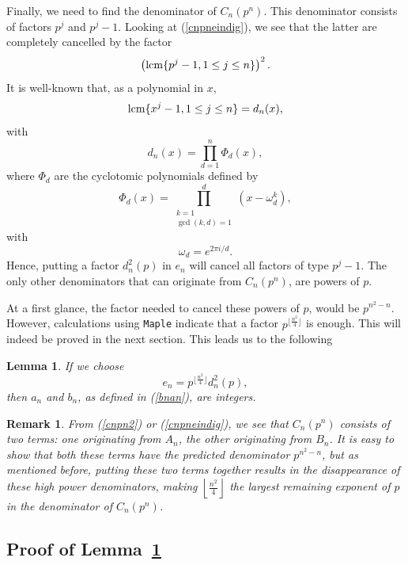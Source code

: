 \documentclass[12pt]{article}
\newtheorem{lemma}[theorem]{Lemma}
\newtheorem{remark}[theorem]{Remark}
\numberwithin{equation}{section}
\begin{document}
Finally, we need to find the denominator of $C_n(p^n)$.
 This denominator consists of factors $p^j$ and $p^j-1$.  Looking at (\ref{cnpneindig}), we
 see that the latter are completely cancelled by the factor
\[\left({\rm lcm}\{p^j-1,1\leq j\leq n\}\right)^2.\]
It is well-known that, as a polynomial in $x$,
\[{\rm lcm}\{x^j-1,1\leq j\leq n\}=d_n(x),\]
with
\begin{equation}\label{dnp}
d_n(x)=\prod_{d=1}^n\Phi_d\left(x\right),
\end{equation}
where $\Phi_d$ are the cyclotomic polynomials
defined by
\[ \Phi_d(x)=\prod_{\substack{k=1\\ \gcd(k,d)=1}}^d (x-\omega_d^k), \]
with
\[\omega_d=e^{2\pi i/d}.\]
Hence, putting a factor $d_n^2(p)$ in $e_n$ will cancel all
factors of type $p^j-1$.  The only other denominators that can originate from $C_n(p^n)$, are powers of $p$.

At a first glance, the factor needed to cancel these powers of
$p$, would be $p^{n^2-n}$.  However, calculations using
\texttt{Maple} indicate that a factor $p^{\lfloor \frac{n^2}{4}\rfloor}$ is enough.
This will indeed be proved in the next section.
This leads us to the following
\begin{lemma}\label{enconj}
If we choose
\begin{equation}\label{en}
e_n =p^{\lfloor\frac{n^2}{4}\rfloor}d_{n}^2(p),
\end{equation}
then $a_n$ and $b_n$, as defined in (\ref{bnan}), are integers.
\end{lemma}

\begin{remark}
\rm From (\ref{cnpn2}) or (\ref{cnpneindig}), we see that $C_n(p^n)$ consists
of two terms: one originating from $A_n$, the other originating
from $B_n$.  It is easy to show that both these terms have the
predicted denominator $p^{n^2-n}$, but as mentioned before,
putting these two terms together results in the disappearance of
these high power denominators, making $\left\lfloor \frac{n^2}{4}
\right\rfloor$ the largest remaining exponent of $p$ in the
denominator of $C_n(p^n)$.
\end{remark}

\subsection{Proof of Lemma~\ref{enconj}}
\end{document}
